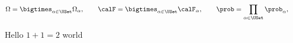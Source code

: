 \documentclass{minimal}
\begin{document}
\[
  \Omega = \bigtimes_{\alpha \in \USet} \Omega_\alpha, \qquad
  \calF = \bigtimes_{\alpha \in \USet} \calF_\alpha, \qquad
  \prob = \prod_{\alpha \in \USet} \prob_\alpha, \qquad
\]

Hello $1 + 1 = 2$ world
\end{document}
